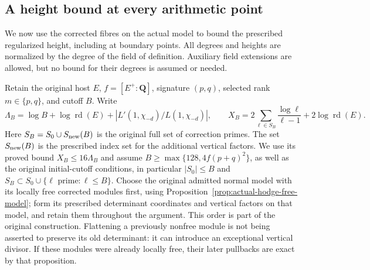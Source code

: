 \subsection{A height bound at every arithmetic point}
\label{sec:actual-point-height}

We now use the corrected fibres on the actual model to bound the
prescribed regularized height, including at boundary points. All
degrees and heights are normalized by the degree of the field of
definition. Auxiliary field extensions are allowed, but no bound for
their degrees is assumed or needed.

Retain the original host $E$, $f=[E^+:\mathbf Q]$, signature $(p,q)$,
selected rank $m\in\{p,q\}$, and cutoff $B$. Write
\[
 \Lambda_B=\log B+\log\operatorname{rd}(E)
       +\left|L'(1,\chi_{-d})/L(1,\chi_{-d})\right|,
 \qquad X_B=2\sum_{\ell\in S_B}\frac{\log\ell}{\ell-1}
                         +2\log\operatorname{rd}(E).
 \tag{PH1}
\]
Here $S_B=S_0\cup S_{\rm new}(B)$ is the original full set of
correction primes. The set $S_{\rm new}(B)$ is the prescribed index
set for the additional vertical factors. We use
its proved bound $X_B\le16\Lambda_B$ and assume
$B\ge\max\{128,4f(p+q)^2\}$, as well as the original initial-cutoff
conditions, in particular $|S_0|\le B$ and
$S_B\subset S_0\cup\{\ell\text{ prime}:\ell\le B\}$.
Choose the original admitted normal model with its locally free
corrected modules first, using
Proposition~\ref{prop:actual-hodge-free-model}; form its prescribed
determinant coordinates and vertical factors on that model, and
retain them throughout the argument. This order is part of the
original construction. Flattening a previously nonfree module is
not being asserted to preserve its old determinant: it can introduce
an exceptional vertical divisor. If these modules were already
locally free, their later pullbacks are exact by that proposition.

